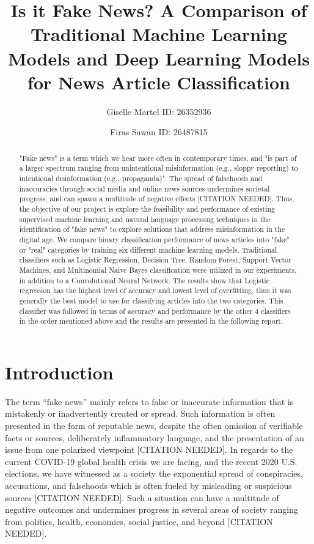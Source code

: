 \documentclass[10pt,twocolumn,letterpaper]{article}
\begin{document}
\title{Is it Fake News? A Comparison of Traditional Machine Learning Models and Deep Learning Models for News Article Classification}
\author{Giselle Martel ID: 26352936 \and Firas Sawan ID: 26487815}
\maketitle
\begin{abstract}
\small
"Fake news" is a term which we hear more often in contemporary times, and "is part of a larger spectrum ranging from unintentional misinformation (e.g., sloppy reporting) to intentional disinformation (e.g., propaganda)"\cite{doi:https://doi.org/10.1002/9781118841570.iejs0128}. The spread of falsehoods and inaccuracies through social media and online news sources undermines societal progress, and can spawn a multitude of negative effects [CITATION NEEDED]. Thus, the objective of our project is explore the feasibility and performance of existing supervised machine learning and natural language processing techniques in the identification of "fake news" to explore solutions that address misinformation in the digital age. We compare binary classification performance of news articles into "fake" or "real" categories by training six different machine learning models. Traditional classifiers such as Logistic Regression, Decision Tree, Random Forest, Support Vector Machines, and Multinomial Naive Bayes classification were utilized in our experiments, in addition to a Convolutional Neural Network. The results show that Logistic regression has the highest level of accuracy and lowest level of overfitting, thus it was generally the best model to use for classifying articles into the two categories. This classifier was followed in terms of accuracy and performance by the other 4 classifiers in the order mentioned above and the results are presented in the following report. 
\end{abstract} 

\section{Introduction}
\small
The term “fake news” mainly refers to false or inaccurate information that is mistakenly or inadvertently created or spread. Such information is often presented in the form of reputable news, despite the often omission of verifiable facts or sources, deliberately inflammatory language, and the presentation of an issue from one polarized viewpoint [CITATION NEEDED]. In regards to the current COVID-19 global health crisis we are facing, and the recent 2020 U.S. elections, we have witnessed as a society the exponential spread of conspiracies, accusations, and falsehoods which is often fueled by misleading or suspicious sources [CITATION NEEDED]. Such a situation can have a multitude of negative outcomes and undermines progress in several areas of society ranging from politics, health, economics, social justice, and beyond [CITATION NEEDED].\par
\end{document}

